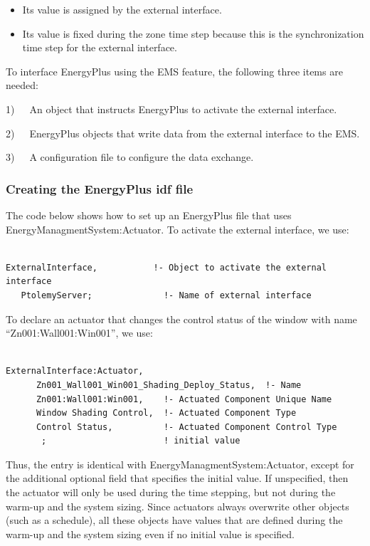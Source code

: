 \begin{itemize}
\item
  Its value is assigned by the external interface.
\item
  Its value is fixed during the zone time step because this is the synchronization time step for the external interface.
\end{itemize}

To interface EnergyPlus using the EMS feature, the following three items are needed:

1)~~~An object that instructs EnergyPlus to activate the external interface.

2)~~~EnergyPlus objects that write data from the external interface to the EMS.

3)~~~A configuration file to configure the data exchange.

\subsubsection{Creating the EnergyPlus idf file}\label{creating-the-energyplus-idf-file-1}

The code below shows how to set up an EnergyPlus file that uses EnergyManagmentSystem:Actuator. To activate the external interface, we use:

\begin{lstlisting}

ExternalInterface,           !- Object to activate the external interface
   PtolemyServer;              !- Name of external interface
\end{lstlisting}

To declare an actuator that changes the control status of the window with name ``Zn001:Wall001:Win001'', we use:

\begin{lstlisting}

ExternalInterface:Actuator,
      Zn001_Wall001_Win001_Shading_Deploy_Status,  !- Name
      Zn001:Wall001:Win001,    !- Actuated Component Unique Name
      Window Shading Control,  !- Actuated Component Type
      Control Status,          !- Actuated Component Control Type
       ;                       ! initial value
\end{lstlisting}

Thus, the entry is identical with EnergyManagmentSystem:Actuator, except for the additional optional field that specifies the initial value. If unspecified, then the actuator will only be used during the time stepping, but not during the warm-up and the system sizing. Since actuators always overwrite other objects (such as a schedule), all these objects have values that are defined during the warm-up and the system sizing even if no initial value is specified.

